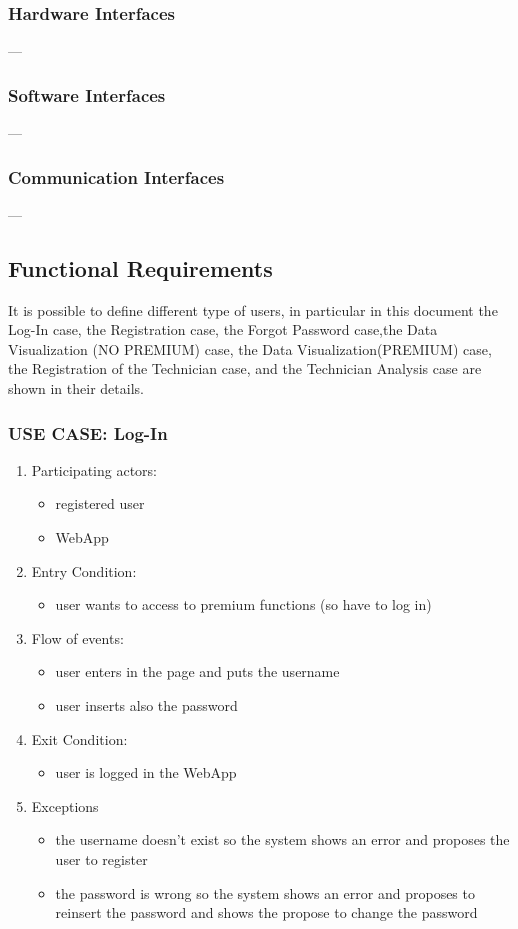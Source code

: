\documentclass{article}
\begin{document}
\subsubsection{Hardware Interfaces}
---
\subsubsection{Software Interfaces}
---
\subsubsection{Communication Interfaces}
---

\subsection{Functional Requirements}
It is possible to define different type of users, in particular in this document the Log-In case, the Registration case, the Forgot Password case,the Data Visualization (NO PREMIUM) case, the Data Visualization(PREMIUM) case, the Registration of the Technician case, and the Technician Analysis case are shown in their details.

\subsubsection{\textbf{USE CASE}: Log-In}
\begin{enumerate}
\item Participating actors: 
\begin{itemize}
    \item registered user
    \item WebApp
\end{itemize}
\item Entry Condition: 
\begin{itemize}
    \item user wants to access to premium functions (so have to log in)
\end{itemize}
\item Flow of events: 
\begin{itemize}
    \item user enters in the page and puts the username
    \item user inserts also the password
\end{itemize}
\item Exit Condition: 
\begin{itemize}
    \item user is logged in the WebApp
\end{itemize}
\item Exceptions
\begin{itemize}
    \item the username doesn’t exist so the system shows an error and proposes the user to register
    \item the password is wrong so the system shows an error and proposes to reinsert the password and shows the propose to change the password 
\end{itemize}
\end{enumerate}
\end{document}
